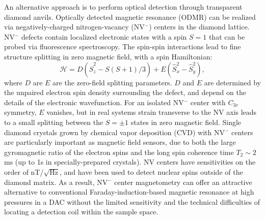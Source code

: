 \documentclass[%
 aip,
 sd,%
 amsmath,amssymb,
 reprint,%
 longbibliography
]{revtex4-1}
\begin{document}
An alternative approach is to perform optical detection through transparent diamond anvils. Optically detected magnetic resonance (ODMR) can be realized via negatively-charged nitrogen-vacancy (NV$^-$) centers in the diamond lattice.  NV$^-$ defects contain localized electronic states with a spin $S=1$ that can be probed via fluorescence spectroscopy. The spin-spin interactions lead to fine structure splitting in zero magnetic field, with a spin Hamiltonian:
\begin{equation}
\mathcal{H} = D\left(\hat{S}_z^2 - S(S+1)/3\right) + {E} \left(\hat{S}_x^2 - \hat{S}_{y}^2\right),
\end{equation}
where $D$ are $E$ are the zero-field splitting parameters.\cite{NVpressurePRL} $D$ and $E$ are determined by the unpaired electron spin density surrounding the defect, and depend on the details of the electronic wavefunction. For an isolated NV$^-$ center with $C_{3v}$ symmetry, $E$ vanishes, but in real systems strain transverse to the NV axis leads to a small splitting between the $S=\pm 1$ states in zero magnetic field.\cite{NVcenterGroupTheoryAnalysis} Single diamond crystals grown by chemical vapor deposition (CVD) with NV$^-$ centers are particularly important as magnetic field sensors, due to both the large gyromagnetic ratio of the electron spins  and the long spin coherence time $T_2 \sim 2 $ms  \cite{Balasubramanian2009} (up to 1s in specially-prepared crystals).\cite{BarGill2013}  NV centers have sensitivities on the order of nT/$\sqrt{\textrm{Hz}}$,\cite{Schoenfeld2011,Shin2012,NVcenterImaging2015} and have been used to detect nuclear spins outside of the diamond matrix.\cite{WratchrupScience2013,RugarNVScience2013}  As a result, NV$^-$ center magnetometry can offer an attractive alternative to conventional Faraday-induction-based magnetic resonance at high pressures in a DAC without the limited sensitivity and the technical difficulties of locating a detection coil within the sample space.
\end{document}
